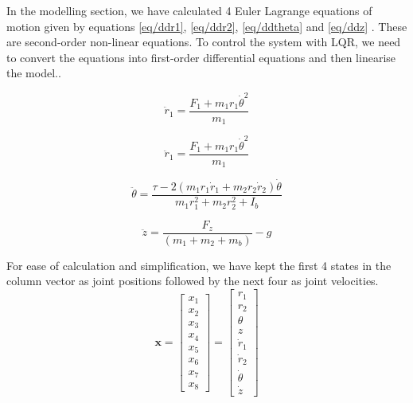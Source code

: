\documentclass{UoNMCHA}
\numberwithin{equation}{section}
\begin{document}
	In the modelling section, we have calculated 4 Euler Lagrange equations of motion given by equations \eqref{eq/ddr1}, \eqref{eq/ddr2}, \eqref{eq/ddtheta} and \eqref{eq/ddz} . These are second-order non-linear equations. To control the system with LQR, we need to convert the equations into first-order differential equations and then linearise the model..\par

	\begin{equation}\label{eq/ddr1}
		\ddot{r}_{1}=\frac{F_{1}+m_{1} r_{1} \dot{\theta}^{2}}{m_{1}}
	\end{equation}


	\begin{equation}\label{eq/ddr2}
		\ddot{r}_{1}=\frac{F_{1}+m_{1} r_{1} \dot{\theta}^{2}}{m_{1}}
	\end{equation}


	\begin{equation}\label{eq/ddtheta}
		\ddot{\theta}=\frac{\tau-2\left(m_{1} r_{1} \dot{r}_{1}+m_{2} r_{2} \dot{r}_{2}\right) \dot{\theta}}{m_{1} r_{1}^{2}+m_{2} r_{2}^{2}+I_{b}}
	\end{equation}


	\begin{equation}\label{eq/ddz}
		\ddot{z}=\frac{F_{z}}{\left(m_{1}+m_{2}+m_{b}\right)}-g
	\end{equation}


For ease of calculation and simplification, we have kept the first 4 states in the column vector as joint positions followed by the next four as joint velocities.
	\begin{equation}
\boldsymbol{x}=\left[\begin{array}{l}
	x_{1} \\
	x_{2} \\
	x_{3} \\
	x_{4} \\
	x_{5} \\
	x_{6} \\
	x_{7} \\
	x_{8}
\end{array}\right]=\left[\begin{array}{c}
	r_{1} \\
	r_{2} \\
	\theta \\
	z \\
	\dot{r}_{1} \\
	\dot{r}_{2} \\
	\dot{\theta} \\
	\dot{z}
\end{array}\right]
	\end{equation}
	
\end{document}
